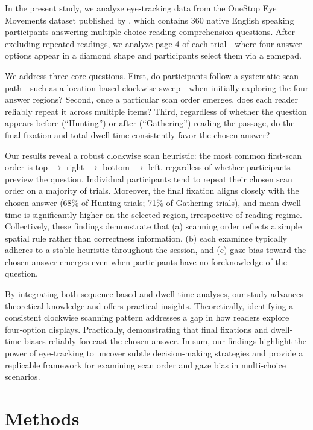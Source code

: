 \documentclass{article}
\begin{document}
    In the present study, we analyze eye‐tracking data from the OneStop Eye Movements dataset published by \cite{berzak2025onestop}, which contains 360 native English speaking participants answering multiple‐choice reading‐comprehension questions. After excluding repeated readings, we analyze page 4 of each trial—where four answer options appear in a diamond shape and participants select them via a gamepad.

    We address three core questions. First, do participants follow a systematic scan path—such as a location-based clockwise sweep—when initially exploring the four answer regions? Second, once a particular scan order emerges, does each reader reliably repeat it across multiple items? Third, regardless of whether the question appears before (“Hunting”) or after (“Gathering”) reading the passage, do the final fixation and total dwell time consistently favor the chosen answer?

    Our results reveal a robust clockwise scan heuristic: the most common first-scan order is top $\to$ right $\to$ bottom $\to$ left, regardless of whether participants preview the question. Individual participants tend to repeat their chosen scan order on a majority of trials. Moreover, the final fixation aligns closely with the chosen answer (68\% of Hunting trials; 71\% of Gathering trials), and mean dwell time is significantly higher on the selected region, irrespective of reading regime. Collectively, these findings demonstrate that (a) scanning order reflects a simple spatial rule rather than correctness information, (b) each examinee typically adheres to a stable heuristic throughout the session, and (c) gaze bias toward the chosen answer emerges even when participants have no foreknowledge of the question.

    By integrating both sequence‐based and dwell‐time analyses, our study advances theoretical knowledge and offers practical insights. Theoretically, identifying a consistent clockwise scanning pattern addresses a gap in how readers explore four‐option displays. Practically, demonstrating that final fixations and dwell‐time biases reliably forecast the chosen answer. In sum, our findings highlight the power of eye‐tracking to uncover subtle decision‐making strategies and provide a replicable framework for examining scan order and gaze bias in multi‐choice scenarios.

\section{Methods}
\end{document}
